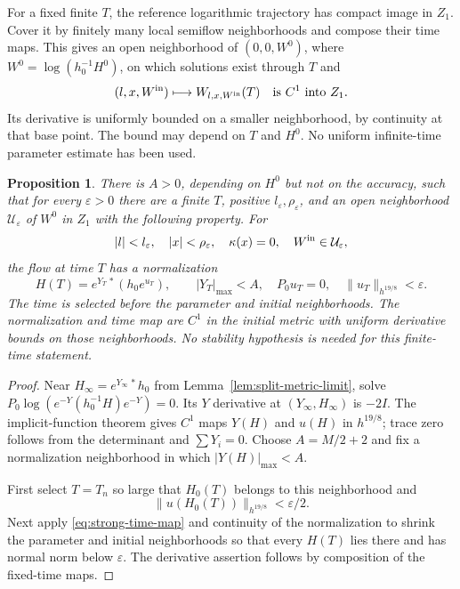 \documentclass[11pt]{amsart}
\newtheorem{proposition}[theorem]{Proposition}
\theoremstyle{definition}
\theoremstyle{remark}
\begin{document}
For a fixed finite $T$, the reference logarithmic trajectory
has compact image in $Z_1$. Cover it by finitely many local
semiflow neighborhoods and compose their time maps. This gives
an open neighborhood of $(0,0,W^0)$, where
$W^0=\log(h_0^{-1}H^0)$, on which solutions exist through $T$
and
\begin{equation}\label{eq:strong-time-map}
 (l,x,W^{\rm in})\longmapsto W_{l,x,W^{\rm in}}(T)
       \quad\text{is }C^1\text{ into }Z_1 .
\end{equation}
Its derivative is uniformly bounded on a smaller neighborhood,
by continuity at that base point. The bound may depend on $T$
and $H^0$. No uniform infinite-time parameter estimate has
been used.

\begin{proposition}\label{prop:common-entry}
There is $A>0$, depending on $H^0$ but not on the accuracy,
such that for every $\varepsilon>0$ there are a finite $T$,
positive $l_\varepsilon,\rho_\varepsilon$, and an open
neighborhood $\mathcal U_\varepsilon$ of $W^0$ in $Z_1$
with the following property. For
\[
 |l|<l_\varepsilon,\quad |x|<\rho_\varepsilon,\quad
 \kappa(x)=0,\quad W^{\rm in}\in\mathcal U_\varepsilon,
\]
the flow at time $T$ has a normalization
\begin{equation}\label{eq:entry-coordinates}
 H(T)=e^{Y_T\,*}(h_0e^{u_T}),\qquad
 |Y_T|_{\max}<A,\quad P_0u_T=0,\quad
 \|u_T\|_{h^{19/8}}<\varepsilon.
\end{equation}
The time is selected before the parameter and initial neighborhoods.
The normalization and time map are $C^1$ in the initial metric
with uniform derivative bounds on those neighborhoods.
No stability hypothesis is needed for this finite-time statement.
\end{proposition}
\begin{proof}
Near $H_\infty=e^{Y_\infty\,*}h_0$ from
Lemma~\ref{lem:split-metric-limit}, solve
$P_0\log(e^{-Y}(h_0^{-1}H)e^{-Y})=0$.
Its $Y$ derivative at $(Y_\infty,H_\infty)$ is $-2I$.
The implicit-function theorem gives $C^1$ maps $Y(H)$ and
$u(H)$ in $h^{19/8}$; trace zero follows from the determinant
and $\sum Y_i=0$. Choose $A=M/2+2$ and fix a normalization
neighborhood in which $|Y(H)|_{\max}<A$.

First select $T=T_n$ so large that $H_0(T)$ belongs to this
neighborhood and
\[
 \|u(H_0(T))\|_{h^{19/8}}<\varepsilon/2.
\]
Next apply \eqref{eq:strong-time-map} and continuity of the
normalization to shrink the parameter and initial neighborhoods
so that every $H(T)$ lies there and has normal norm below
$\varepsilon$. The derivative assertion follows by composition
of the fixed-time maps.
\end{proof}
\end{document}
